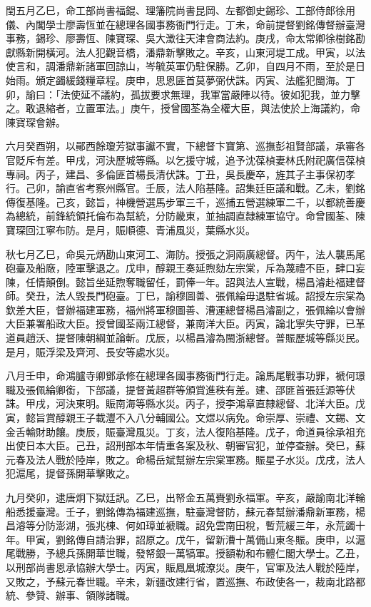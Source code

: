 \begin{pinyinscope}
閏五月乙巳，命工部尚書福錕、理籓院尚書昆岡、左都御史錫珍、工部侍郎徐用儀、內閣學士廖壽恆並在總理各國事務衙門行走。丁未，命前提督劉銘傳督辦臺灣事務，錫珍、廖壽恆、陳寶琛、吳大澂往天津會商法約。庚戌，命太常卿徐樹銘勘獻縣新開橫河。法人犯觀音橋，潘鼎新擊敗之。辛亥，山東河堤工成。甲寅，以法使言和，調潘鼎新諸軍回諒山，岑毓英軍仍駐保勝。乙卯，自四月不雨，至於是日始雨。頒定蠲緩錢糧章程。庚申，思恩匪首莫夢弼伏誅。丙寅、法艦犯閩海。丁卯，諭曰：「法使延不議約，孤拔要求無理，我軍當嚴陣以待。彼如犯我，並力擊之。敢退縮者，立置軍法。」庚午，授曾國荃為全權大臣，與法使於上海議約，命陳寶琛會辦。

六月癸酉朔，以鄖西餘瓊芳獄事讞不實，下總督卞寶第、巡撫彭祖賢部議，承審各官貶斥有差。甲戌，河決歷城等縣。以乞援守城，追予沈葆楨妻林氏附祀廣信葆楨專祠。丙子，建昌、多倫匪首楊長清伏誅。丁丑，吳長慶卒，旌其子主事保初孝行。己卯，諭直省考察州縣官。壬辰，法人陷基隆。詔集廷臣議和戰。乙未，劉銘傳復基隆。己亥，懿旨，神機營選馬步軍三千，巡捕五營選練軍二千，以都統善慶為總統，前鋒統領托倫布為幫統，分防畿東，並抽調直隸練軍協守。命曾國荃、陳寶琛回江寧布防。是月，賑順德、青浦風災，葉縣水災。

秋七月乙巳，命吳元炳勘山東河工、海防。授張之洞兩廣總督。丙午，法人襲馬尾砲臺及船廠，陸軍擊退之。戊申，醇親王奏延煦劾左宗棠，斥為蔑禮不臣，肆口妄陳，任情顛倒。懿旨坐延煦奪職留任，罰俸一年。詔與法人宣戰，楊昌濬赴福建督師。癸丑，法人毀長門砲臺。丁巳，諭穆圖善、張佩綸毋退駐省城。詔授左宗棠為欽差大臣，督辦福建軍務，福州將軍穆圖善、漕運總督楊昌濬副之，張佩綸以會辦大臣兼署船政大臣。授曾國荃兩江總督，兼南洋大臣。丙寅，論北寧失守罪，已革道員趙沃、提督陳朝綱並論斬。戊辰，以楊昌濬為閩浙總督。普賑歷城等縣災民。是月，賑浮梁及齊河、長安等處水災。

八月壬申，命鴻臚寺卿鄧承修在總理各國事務衙門行走。論馬尾戰事功罪，褫何璟職及張佩綸卿銜，下部議，提督黃超群等頒賞進秩有差。建、邵匪首張廷源等伏誅。甲戌，河決東明。賑南海等縣水災。丙子，授李鴻章直隸總督、北洋大臣。戊寅，懿旨賞醇親王子載灃不入八分輔國公。文煜以病免。命崇厚、崇禮、文錫、文金舌輸財助饟。庚辰，賑臺灣風災。丁亥，法人復陷基隆。戊子，命道員徐承祖充出使日本大臣。己丑，詔刑部本年情重各案及秋、朝審官犯，並停查辦。癸巳，蘇元春及法人戰於陸岸，敗之。命楊岳斌幫辦左宗棠軍務。賑星子水災。戊戌，法人犯滬尾，提督孫開華擊敗之。

九月癸卯，逮唐炯下獄廷訊。乙巳，出帑金五萬賚劉永福軍。辛亥，嚴諭南北洋輪船悉援臺灣。壬子，劉銘傳為福建巡撫，駐臺灣督防，蘇元春幫辦潘鼎新軍務，楊昌濬等分防澎湖，張兆棟、何如璋並褫職。詔免雲南田稅，暫荒緩三年，永荒蠲十年。甲寅，劉銘傳自請治罪，詔原之。戊午，留新漕十萬備山東冬賑。庚申，以滬尾戰勝，予總兵孫開華世職，發帑銀一萬犒軍。授額勒和布體仁閣大學士。乙丑，以刑部尚書恩承協辦大學士。丙寅，賑鳳凰城潦災。庚午，官軍及法人戰於陸岸，又敗之，予蘇元春世職。辛未，新疆改建行省，置巡撫、布政使各一，裁南北路都統、參贊、辦事、領隊諸職。


\end{pinyinscope}
